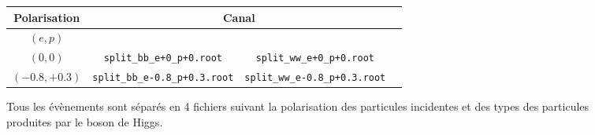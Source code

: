 

\begin{figure}[h!]
	\centering
	\begin{tabular}{ | c | c | c | c | }
		\hline
		Polarisation & \multicolumn{2}{c|}{Canal} \\
		\hline
		$(e,p)$ & \bb &  \WW \\
		\hline
		$(0,0)$ & \verb|split_bb_e+0_p+0.root| & \verb|split_ww_e+0_p+0.root| \\
		\hline \cline{2-3}
		$(-0.8, +0.3)$ & \verb|split_bb_e-0.8_p+0.3.root| & \verb|split_ww_e-0.8_p+0.3.root| \\
		\hline
	\end{tabular}
	\label{files:split}
	\caption{Tous les évènements sont séparés en 4 fichiers suivant la polarisation des particules incidentes et des types des particules produites par le boson de Higgs.}
\end{figure}